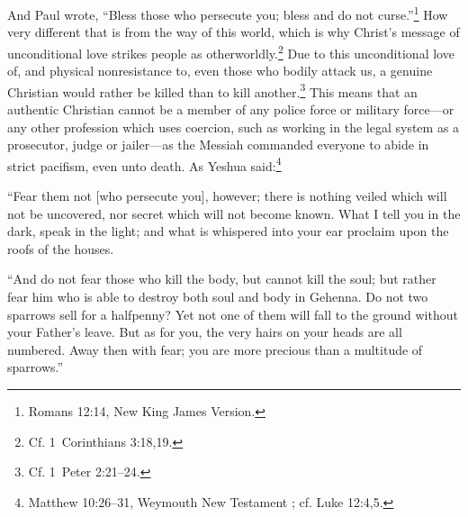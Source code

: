 \documentclass[letterpaper,12pt]{article}
\newenvironment{squotation}
  {\small\quotation}
  {\endquotation\normalsize}
\begin{document}
And Paul wrote, ``Bless those who persecute you; bless and do not curse.''\footnote{Romans 12:14, New King James Version.} How very different that is from the way of this world, which is why Christ's message of unconditional love strikes people as otherworldly.\footnote{Cf. 1~Corinthians 3:18,19.} Due to this unconditional love of, and physical nonresistance to, even those who bodily attack us, a genuine Christian would rather be killed than to kill another.\footnote{Cf. 1~Peter 2:21--24.} This means that an authentic Christian cannot be a member of any police force or military force---or any other profession which uses coercion, such as working in the legal system as a prosecutor, judge or jailer---as the Messiah commanded everyone to abide in strict pacifism, even unto death. As Yeshua said:\footnote{Matthew 10:26--31, Weymouth New Testament \cite{Weymouth1903}; cf. Luke 12:4,5.}

\begin{squotation}
``Fear them not [who persecute you], however; there is nothing veiled which will not be uncovered, nor secret which will not become known. What I tell you in the dark, speak in the light; and what is whispered into your ear proclaim upon the roofs of the houses.

``And do not fear those who kill the body, but cannot kill the soul; but rather fear him who is able to destroy both soul and body in Gehenna. Do not two sparrows sell for a halfpenny? Yet not one of them will fall to the ground without your Father's leave. But as for you, the very hairs on your heads are all numbered. Away then with fear; you are more precious than a multitude of sparrows.''
\end{squotation}
\end{document}
